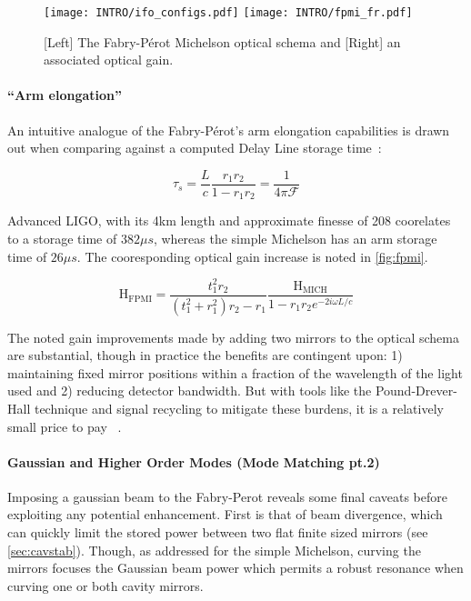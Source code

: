\begin{figure}[ht!]
  \begin{subcaptiongroup}{\texttt{[image: INTRO/ifo\_configs.pdf]}}
  \texttt{[image: INTRO/fpmi\_fr.pdf]}
  \end{subcaptiongroup}
  \hfill
  \caption{[Left] The Fabry-P\'{e}rot Michelson optical schema and [Right] an associated optical gain.}
  \label{fig:fpmi}
\end{figure}

\paragraph{``Arm elongation''}

An intuitive analogue of the Fabry-P\'{e}rot's arm elongation capabilities is drawn out when comparing against a computed Delay Line storage time~\cite{saulson:2017}:

\begin{equation}
	\tau_s = \frac{L}{c} \frac{r_1r_2}{1-r_1r_2} = \frac{1}{4 \pi \mathscr{F}}
\end{equation}

Advanced LIGO, with its 4km length and approximate finesse of 208 coorelates to a storage time of $382\mu s$, whereas the simple Michelson has an arm storage time of $26 \mu s$. The cooresponding optical gain increase is noted in \autoref{fig:fpmi}. 

\begin{equation}
	\mathrm{H_{FPMI}} = \frac{t_1 ^2 r_2}{(t_1^2 + r_1^2)r_2 - r_1} \frac{\mathrm{H_{MICH}}}{1 - r_1 r_2 e^{-2i \omega L / c}}
\end{equation}

The noted gain improvements made by adding two mirrors to the optical schema are substantial, though in practice the benefits are contingent upon: 1) maintaining fixed mirror positions within a fraction of the wavelength of the light used and 2) reducing detector bandwidth. But with tools like the Pound-Drever-Hall technique and signal recycling to mitigate these burdens, it is a relatively small price to pay ~\cite{black:pdh}.

\paragraph{Gaussian and Higher Order Modes (Mode Matching pt.2)}\label{subsubsubsubsec:mm2}

Imposing a gaussian beam to the Fabry-Perot reveals some final caveats before exploiting any potential enhancement. First is that of beam divergence, which can quickly limit the stored power between two flat finite sized mirrors (see \autoref{sec:cavstab}). Though, as addressed for the simple Michelson, curving the mirrors focuses the Gaussian beam power which permits a robust resonance when curving one or both cavity mirrors. 

